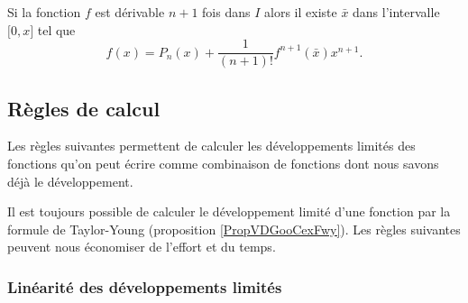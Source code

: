 \begin{proposition}
	Si la fonction \( f\) est dérivable \( n+1\) fois dans \( I\) alors il existe \( \bar x\) dans l'intervalle \( \mathopen[ 0 , x \mathclose]\) tel que
	\begin{equation}
		f(x) = P_n(x) + \frac{1}{(n+1)!} f^{n+1}(\bar x) x^{n+1}.
	\end{equation}
\end{proposition}

\subsection{Règles de calcul}

Les règles suivantes permettent de calculer les développements limités des fonctions qu'on peut écrire comme combinaison de fonctions dont nous savons déjà le développement.

Il est toujours possible de calculer le développement limité d'une fonction par la formule de Taylor-Young (proposition \ref{PropVDGooCexFwy}). Les règles suivantes peuvent nous économiser de l'effort et du temps.

\subsubsection{Linéarité des développements limités}


